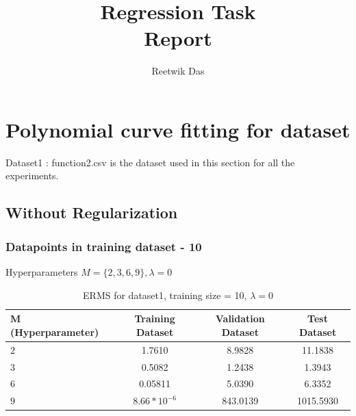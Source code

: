 \documentclass[11pt]{article}
\title{Regression Task\\
Report}
\author{Reetwik Das}
\begin{document}
\maketitle
\newpage
\tableofcontents
\listoftables
\listoffigures

\newpage 

\section{Polynomial curve fitting for dataset}
Dataset1 : function2.csv is the dataset used in this section for all the experiments.

\subsection{Without Regularization}
\subsubsection{Datapoints in training dataset - 10}
Hyperparameters $M = \{2,3,6,9\}, \lambda = 0$
\begin{table}[h!]
\label{tab:tab1.1.1}
\begin{center}
\begin{tabular}{|l|c|c|c|}
\hline
\textbf{M (Hyperparameter)} & \textbf{Training Dataset} & \textbf{Validation Dataset} &\textbf{Test Dataset}\\
\hline
$2$ & 1.7610 & 8.9828 & 11.1838\\
\hline
$3$ & 0.5082 & 1.2438 & 1.3943\\
\hline
$6$ & 0.05811 & 5.0390 & 6.3352\\
\hline
$9$ & $8.66*10^{-6}$ & 843.0139 & 1015.5930\\
\hline
\end{tabular}
\caption{ERMS for dataset1, training size = 10, $\lambda = 0$}
\end{center}
\end{table}
\end{document}
